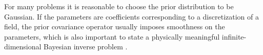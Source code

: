 \documentclass[11pt,final]{article}%
\renewcommand{\matrix}[1] {\ensuremath{\boldsymbol{#1}}}
\renewcommand{\vec}[1] {\ensuremath{\boldsymbol{#1}}}
\begin{document}
%
For many problems it is reasonable to choose the prior distribution to be Gaussian. If the parameters are coefficients corresponding to a discretization of a field, the prior covariance operator usually
imposes smoothness on the parameters, which is also important to state a physically meaningful infinite-dimensional Bayesian inverse problem
\cite{Stuart10,Bui-ThanhGhattasMartinEtAl13}.
\end{document}
